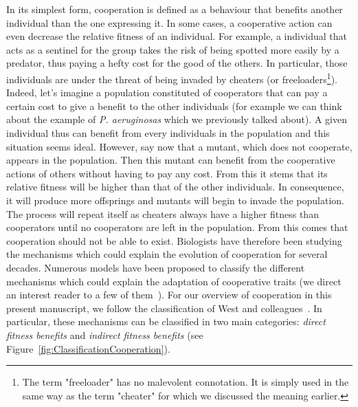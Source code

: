     In its simplest form, cooperation is defined as a behaviour that benefits another individual than the one expressing it. In some cases, a cooperative action can even decrease the relative fitness of an individual. For example, a individual that acts as a sentinel for the group takes the risk of being spotted more easily by a predator, thus paying a hefty cost for the good of the others. In particular, those individuals are under the threat of being invaded by cheaters (or freeloaders\footnote{The term "freeloader" has no malevolent connotation. It is simply used in the same way as the term "cheater" for which we discussed the meaning earlier.}). Indeed, let's imagine a population constituted of cooperators that can pay a certain cost to give a benefit to the other individuals (for example we can think about the example of \emph{P. aeruginosas} which we previously talked about). A given individual thus can benefit from every individuals in the population and this situation seems ideal. However, say now that a mutant, which does not cooperate, appears in the population. Then this mutant can benefit from the cooperative actions of others without having to pay any cost. From this it stems that its relative fitness will be higher than that of the other individuals. In consequence, it will produce more offsprings and mutants will begin to invade the population. The process will repeat itself as cheaters always have a higher fitness than cooperators until no cooperators are left in the population. From this comes that cooperation should not be able to exist. Biologists have therefore been studying the mechanisms which could explain the evolution of cooperation for several decades. Numerous models have been proposed to classify the different mechanisms which could explain the adaptation of cooperative traits (we direct an interest reader to a few of them~\parencite{Dugatkin2002, Keller2006, Bergmuller2007a, West2007}). For our overview of cooperation in this present manuscript, we follow the classification of West and colleagues~\parencite{West2007a}. In particular, these mechanisms can be classified in two main categories: \emph{direct fitness benefits} and \emph{indirect fitness benefits} (see Figure~\ref{fig:ClassificationCooperation}).

